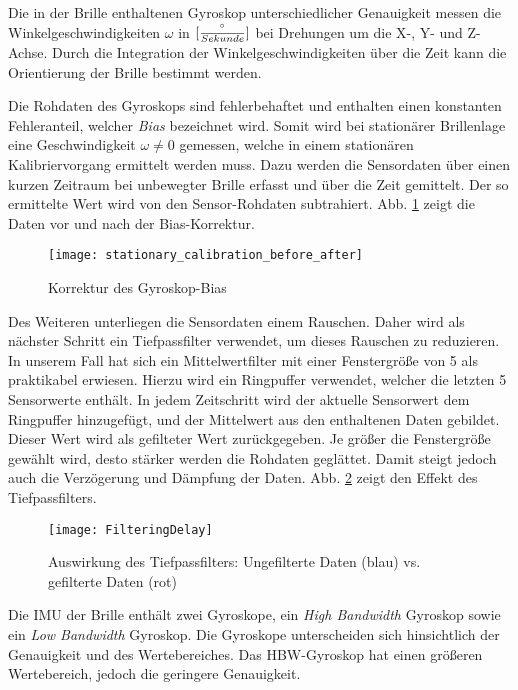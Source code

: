Die in der Brille enthaltenen Gyroskop unterschiedlicher Genauigkeit messen die Winkelgeschwindigkeiten $\omega$ in $[{\degree \over Sekunde}]$ bei Drehungen um die X-, Y- und Z-Achse. Durch
die Integration der Winkelgeschwindigkeiten über die Zeit kann die
Orientierung der Brille bestimmt werden.  

Die Rohdaten des Gyroskops sind fehlerbehaftet und enthalten einen
konstanten Fehleranteil, welcher \emph{Bias} bezeichnet wird. Somit wird
bei stationärer Brillenlage eine Geschwindigkeit $\omega \neq 0$
gemessen, welche in einem stationären Kalibriervorgang ermittelt werden
muss. Dazu werden die Sensordaten über einen kurzen Zeitraum bei
unbewegter Brille erfasst und über die Zeit gemittelt. Der so ermittelte
Wert wird von den Sensor-Rohdaten subtrahiert. Abb.  \ref{fig:gyro_bias}
zeigt die Daten vor und nach der Bias-Korrektur.

\begin{figure}[h]
   \centering
   \texttt{[image: stationary\_calibration\_before\_after]}
   \caption{Korrektur des Gyroskop-Bias}
   \label{fig:gyro_bias}
\end{figure}

Des Weiteren unterliegen die Sensordaten einem Rauschen. Daher wird als
nächster Schritt ein Tiefpassfilter verwendet, um dieses Rauschen zu
reduzieren. In unserem Fall hat sich ein Mittelwertfilter mit einer
Fenstergröße von 5 als praktikabel erwiesen. Hierzu wird ein Ringpuffer
verwendet, welcher die letzten 5 Sensorwerte enthält. In jedem
Zeitschritt wird der aktuelle Sensorwert dem Ringpuffer hinzugefügt, und
der Mittelwert aus den enthaltenen Daten gebildet. Dieser Wert wird als
gefilteter Wert zurückgegeben. Je größer die Fenstergröße gewählt wird,
desto stärker werden die Rohdaten geglättet. Damit steigt jedoch auch
die Verzögerung und Dämpfung der Daten. Abb. \ref{fig:lowpass-delay}
zeigt den Effekt des Tiefpassfilters.

\begin{figure}[h]
   \centering
   \texttt{[image: FilteringDelay]}
   \caption{Auswirkung des Tiefpassfilters: Ungefilterte Daten (blau) vs. gefilterte Daten (rot)}
   \label{fig:lowpass-delay}
\end{figure}

Die \ac{IMU} der Brille enthält zwei
Gyroskope, ein \emph{High Bandwidth} Gyroskop sowie ein
\emph{Low Bandwidth} Gyroskop. Die Gyroskope unterscheiden sich
hinsichtlich der Genauigkeit und des Wertebereiches. Das \ac{HBW}-Gyroskop
hat einen größeren Wertebereich, jedoch die geringere
Genauigkeit.

